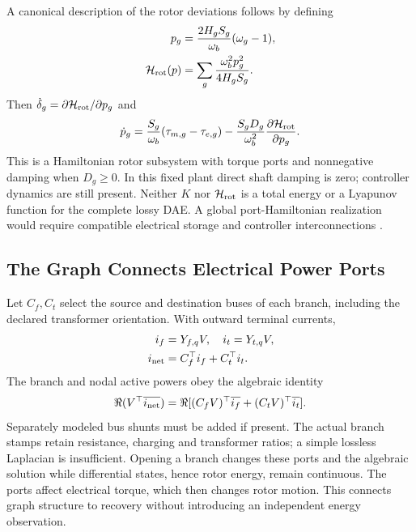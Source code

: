 A canonical description of the rotor deviations follows by defining
\begin{align}
 p_g&=\frac{2H_gS_g}{\omega_b}(\omega_g-1),\nonumber\\
 \mathcal H_{\rm rot}(p)&=\sum_g\frac{\omega_b^2p_g^2}{4H_gS_g}.
\end{align}
Then $\dot\delta_g=\partial\mathcal H_{\rm rot}/\partial p_g$ and
\begin{equation}
 \dot p_g=\frac{S_g}{\omega_b}(\tau_{m,g}-\tau_{e,g})
 -\frac{S_gD_g}{\omega_b^2}\frac{\partial\mathcal H_{\rm rot}}{\partial p_g}.
\end{equation}
This is a Hamiltonian rotor subsystem with torque ports and nonnegative
damping when $D_g\ge0$. In this fixed plant direct shaft damping is zero;
controller dynamics are still present. Neither $K$ nor
$\mathcal H_{\rm rot}$ is a total energy or a Lyapunov function for the
complete lossy DAE. A global port-Hamiltonian realization would require
compatible electrical storage and controller interconnections
\cite{fiaz2013port}.

\subsection{The Graph Connects Electrical Power Ports}
Let $C_f,C_t$ select the source and destination buses of each branch,
including the declared transformer orientation. With outward terminal
currents,
\begin{align}
 i_f&=Y_{f,q}V,\quad i_t=Y_{t,q}V,\nonumber\\
 i_{\rm net}&=C_f^\top i_f+C_t^\top i_t.
\end{align}
The branch and nodal active powers obey the algebraic identity
\begin{equation}
 \Re(V^\top\overline{i_{\rm net}})=
 \Re[(C_fV)^\top\overline{i_f}+(C_tV)^\top\overline{i_t}].
 \label{eq:graph-power-ports}
\end{equation}
Separately modeled bus shunts must be added if present. The actual branch
stamps retain resistance, charging and transformer ratios; a simple
lossless Laplacian is insufficient. Opening a branch changes these ports
and the algebraic solution while differential states, hence rotor energy,
remain continuous. The ports affect electrical torque, which then changes
rotor motion. This connects graph structure to recovery without introducing
an independent energy observation.

